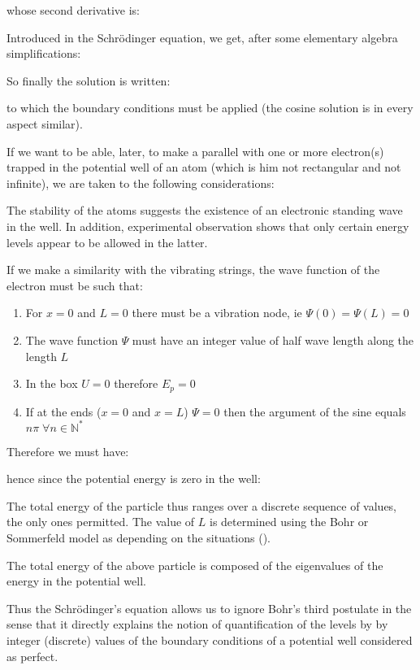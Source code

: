 	whose second derivative is:
	
	Introduced in the Schrödinger equation, we get, after some elementary algebra simplifications:
	
	So finally the solution is written:
	
	to which the boundary conditions must be applied (the cosine solution is in every aspect similar).

	If we want to be able, later, to make a parallel with one or more electron(s) trapped in the potential well of an atom (which is him not rectangular and not infinite), we are taken to the following considerations:

	The stability of the atoms suggests the existence of an electronic standing wave in the well. In addition, experimental observation shows that only certain energy levels appear to be allowed in the latter.

	If we make a similarity with the vibrating strings, the wave function of the electron must be such that:
	\begin{enumerate}
		\item For $x=0$ and $L=0$ there must be a vibration node, ie $\Psi(0)=\Psi(L)=0$

		\item The wave function $\Psi$ must have an integer value of half wave length along the length $L$

		\item In the box $U=0$ therefore $E_p=0$

		\item If at the ends ($x=0$ and $x=L$) $\Psi=0$ then the argument of the sine equals $n\pi\; \forall n\in\mathbb{N}^{*}$
	\end{enumerate}
	Therefore we must have:
	
	hence since the potential energy is zero in the well:
	
	The total energy of the particle thus ranges over a discrete sequence of values, the only ones permitted. The value of $L$ is determined using the Bohr or Sommerfeld model as depending on the situations ().

	The total energy of the above particle is composed of the eigenvalues of the energy in the potential well.

	Thus the Schrödinger's equation allows us to ignore Bohr's third postulate in the sense that it directly explains the notion of quantification of the levels by by integer (discrete) values of the boundary conditions of a potential well considered as perfect.

